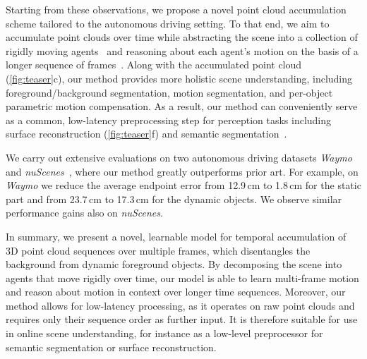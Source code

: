 Starting from these observations, we propose a novel point cloud accumulation scheme tailored to the autonomous driving setting. To that end, we aim to accumulate point clouds over time while abstracting the scene into a collection of rigidly moving agents~\cite{behl2019pointflownet,gojcic2021weakly,teed2021raft}
and reasoning about each agent's motion on the basis of a longer sequence of frames~\cite{huang2021multibodysync,huang2022multiway}. 
Along with the accumulated point cloud (\cref{fig:teaser}c), our method provides more holistic scene understanding, including foreground/background segmentation, motion segmentation, and per-object parametric motion compensation. As a result, our method can conveniently serve as a common, low-latency preprocessing step for perception tasks including surface reconstruction (\cref{fig:teaser}f) and semantic segmentation~\cite{behley2019semantickitti}.

We carry out extensive evaluations on two autonomous driving datasets \emph{Waymo}~\cite{sun2020scalability} and \emph{nuScenes}~\cite{caesar2020nuscenes}, where our method greatly outperforms prior art. For example, on \emph{Waymo} we reduce the average endpoint error from 12.9$\,$cm to 1.8$\,$cm for the static part and from 23.7$\,$cm to 17.3$\,$cm for the dynamic objects. We observe similar performance gains also on \emph{nuScenes}.

In summary, we present a novel, learnable model for temporal accumulation of 3D point cloud sequences over multiple frames, which disentangles the background from dynamic foreground objects. By decomposing the scene into agents that move rigidly over time, our model is able to learn multi-frame motion and reason about motion in context over longer time sequences. Moreover, our method allows for low-latency processing, as it operates on raw point clouds and requires only their sequence order as further input. It is therefore suitable for use in online scene understanding, for instance as a low-level preprocessor for semantic segmentation or surface reconstruction.